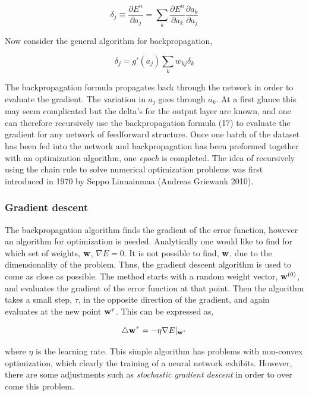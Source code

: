 \documentclass[12pt, letterpaper]{amsart}%
\begin{document}
\begin{equation}
    \delta_j \equiv \frac{\partial E^n}{\partial a_j} = \sum_k \frac{\partial E^n}{\partial a_k} \frac{\partial a_k}{\partial a_j}
\end{equation}

Now consider the general algorithm for backpropagation,

\begin{equation}
    \delta_j = g \prime (a_j) \sum_k w_{kj} \delta_k
\end{equation}

The backpropagation formula propagates back through the network in order to evaluate the gradient. The variation in $a_j$ goes through $a_k$. At a first glance this may seem complicated but the delta's for the output layer are known, and one can therefore recursively use the backpropagation formula (17) to evaluate the gradient for any network of feedforward structure. Once one batch of the dataset has been fed into the network and backpropagation has been preformed together with an optimization algorithm, one \textit{epoch} is completed. The idea of recursively using the chain rule to solve numerical optimization problems was first introduced in 1970 by Seppo Linnainmaa (Andreas Griewank 2010).

\subsubsection{Gradient descent}
The backpropagation algorithm finds the gradient of the error function, however an algorithm for optimization is needed. Analytically one would like to find for which set of weights, $\bold{w}$, $\nabla E=0$. It is not possible to find, $\bold{w}$, due to the dimensionality of the problem. Thus, the gradient descent algorithm is used to come as close as possible. The method starts with a random weight vector, $\bold{w}^{(0)}$, and evaluates the gradient of the error function at that point. Then the algorithm takes a small step, $\tau$, in the opposite direction of the gradient, and again evaluates at the new point $\bold{w}^{\tau}$. This can be expressed as,

\begin{equation}
\triangle \bold{w}^{\tau} = - \eta \nabla E \vert_{\bold{w}^{\tau}}
\end{equation}

where $\eta$ is the learning rate. This simple algorithm has problems with non-convex optimization, which clearly the training of a neural network exhibits. However, there are some adjustments such as \textit{stochastic gradient descent} in order to over come this problem.
\end{document}
